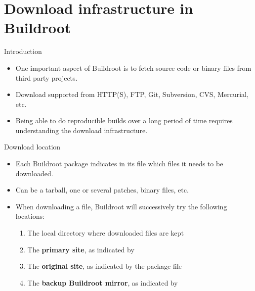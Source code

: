
\section{Download infrastructure in Buildroot}

\begin{frame}{Introduction}
  \begin{itemize}
  \item One important aspect of Buildroot is to fetch source code or
    binary files from third party projects.
  \item Download supported from HTTP(S), FTP, Git, Subversion, CVS,
    Mercurial, etc.
  \item Being able to do reproducible builds over a long period of
    time requires understanding the download infrastructure.
  \end{itemize}
\end{frame}

\begin{frame}{Download location}
  \begin{itemize}
  \item Each Buildroot package indicates in its  file which
    files it needs to be downloaded.
  \item Can be a tarball, one or several patches, binary files, etc.
  \item When downloading a file, Buildroot will successively try the
    following locations:
    \begin{enumerate}
    \item The local  directory where downloaded files
      are kept
    \item The {\bf primary site}, as indicated by 
    \item The {\bf original site}, as indicated by the package
       file
    \item The {\bf backup Buildroot mirror}, as indicated by
    \end{enumerate}
  \end{itemize}
\end{frame}

